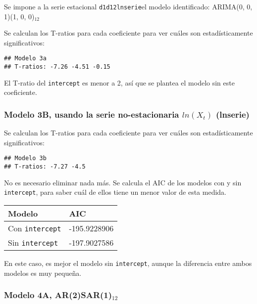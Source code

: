 \documentclass[
]{article}
\begin{document}
Se impone a la serie estacional \texttt{d1d12lnserie}el modelo
identificado: ARIMA(0, 0, 1)(1, 0, 0)\(_{12}\)

Se calculan los T-ratios para cada coeficiente para ver cuáles son
estadísticamente significativos:

\begin{verbatim}
## Modelo 3a 
## T-ratios: -7.26 -4.51 -0.15
\end{verbatim}

El T-ratio del \texttt{intercept} es menor a 2, así que se plantea el
modelo sin este coeficiente.

\medskip

\hypertarget{modelo-3b-usando-la-serie-no-estacionaria-lnx_t-lnserie}{%
\subsubsection{\texorpdfstring{Modelo 3B, usando la serie
no-estacionaria \(ln(X_t)\)
(lnserie)}{Modelo 3B, usando la serie no-estacionaria ln(X\_t) (lnserie)}}\label{modelo-3b-usando-la-serie-no-estacionaria-lnx_t-lnserie}}

Se calculan los T-ratios para cada coeficiente para ver cuáles son
estadísticamente significativos:

\begin{verbatim}
## Modelo 3b 
## T-ratios: -7.27 -4.5
\end{verbatim}

No es necesario eliminar nada más. Se calcula el AIC de los modelos con
y sin \texttt{intercept}, para saber cuál de ellos tiene un menor valor
de esta medida.

\begin{longtable}[]{@{}ll@{}}
\toprule()
Modelo & AIC \\
\midrule()
\endhead
Con \texttt{intercept} & -195.9228906 \\
Sin \texttt{intercept} & -197.9027586 \\
\bottomrule()
\end{longtable}

En este caso, es mejor el modelo sin \texttt{intercept}, aunque la
diferencia entre ambos modelos es muy pequeña.

\medskip

\hypertarget{modelo-4a-ar2sar1_12}{%
\subsubsection{\texorpdfstring{Modelo 4A,
AR(2)SAR(1)\(_{12}\)}{Modelo 4A, AR(2)SAR(1)\_\{12\}}}\label{modelo-4a-ar2sar1_12}}
\end{document}
